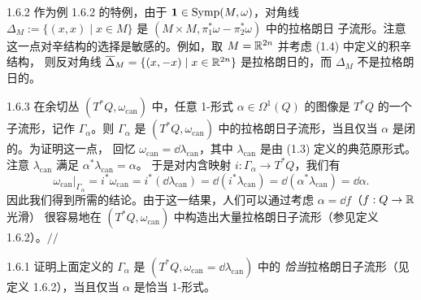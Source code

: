 \begin{wrem}{1.6.2}
作为例 1.6.2 的特例，由于 $\mathbf{1}\in\operatorname{Symp}(M,\omega)$，对角线
$\Delta_M:=\{(x,x)\mid x\in M\}$ 是 $(M\times M,\pi_1^*\omega-\pi_2^*\omega)$ 中的拉格朗日
子流形。注意这一点对辛结构的选择是敏感的。例如，取 $M=\mathbb{R}^{2n}$ 并考虑 (1.4) 中定义的积辛结构，
则反对角线 $\overline{\Delta}_M=\{(x,-x)\mid x\in\mathbb{R}^{2n}\}$ 是拉格朗日的，而 $\Delta_M$
不是拉格朗日的。
\end{wrem}

\begin{wexam}{1.6.3}
在余切丛 $(T^*Q,\omega_{\mathrm{can}})$ 中，任意 1-形式 $\alpha\in\Omega^1(Q)$ 的图像是
$T^*Q$ 的一个子流形，记作 $\Gamma_\alpha$。则 $\Gamma_\alpha$ 是
$(T^*Q,\omega_{\mathrm{can}})$ 中的拉格朗日子流形，当且仅当 $\alpha$ 是闭的。为证明这一点，
回忆 $\omega_{\mathrm{can}}=\dd\lambda_{\mathrm{can}}$，其中 $\lambda_{\mathrm{can}}$ 是由 (1.3)
定义的典范原形式。注意 $\lambda_{\mathrm{can}}$ 满足 $\alpha^*\lambda_{\mathrm{can}}=\alpha$。
于是对内含映射 $i:\Gamma_\alpha\to T^*Q$，我们有
\[
  \omega_{\mathrm{can}}|_{\Gamma_\alpha}=i^*\omega_{\mathrm{can}}
  =i^*(\dd\lambda_{\mathrm{can}})=\dd(i^*\lambda_{\mathrm{can}})
  =\dd(\alpha^*\lambda_{\mathrm{can}})=\dd\alpha .
\]
因此我们得到所需的结论。由于这一结果，人们可以通过考虑 $\alpha=\dd f$（$f:Q\to\mathbb{R}$ 光滑）
很容易地在 $(T^*Q,\omega_{\mathrm{can}})$ 中构造出大量拉格朗日子流形（参见定义 1.6.2）。\hfill$//$
\end{wexam}

\begin{wexer}{1.6.1}
证明上面定义的 $\Gamma_\alpha$ 是 $(T^*Q,\omega_{\mathrm{can}}=\dd\lambda_{\mathrm{can}})$ 中的
\emph{恰当}拉格朗日子流形（见定义 1.6.2），当且仅当 $\alpha$ 是恰当 1-形式。
\end{wexer}

